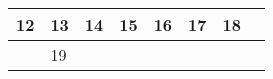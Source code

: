 {\begin{tabularx}{\linewidth}{|l!{\vrule width \myLenLineThicknessThick}*{7}{@{}X@{}|}}
      
      
        \begin{minipage}[t]{6mm}\centering{}12\end{minipage}
      
       & 
    
      
      
        \begin{minipage}[t]{6mm}\centering{}13\end{minipage}
      
       & 
    
      
      
        \begin{minipage}[t]{6mm}\centering{}14\end{minipage}
      
       & 
    
      
      
        \begin{minipage}[t]{6mm}\centering{}15\end{minipage}
      
       & 
    
      
      
        \begin{minipage}[t]{6mm}\centering{}16\end{minipage}
      
       & 
    
      
      
        \begin{minipage}[t]{6mm}\centering{}17\end{minipage}
      
       & 
    
      
      
        \begin{minipage}[t]{6mm}\centering{}18\end{minipage}
      
      
        \\  \hline 
      
    
  
  
  
  \hyperlink{week-2026-3}{} &
    
      
      
        \begin{minipage}[t]{6mm}\centering{}19\end{minipage}
      

\end{tabularx}}
